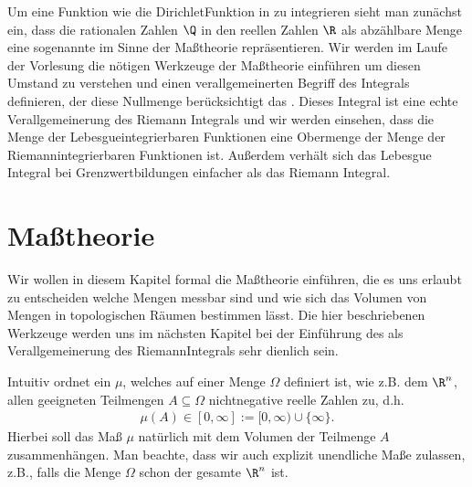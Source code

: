 \documentclass[letterpaper,10pt,english]{jupyterBook}
\begin{document}
\sphinxAtStartPar
Um eine Funktion wie die Dirichlet\sphinxhyphen{}Funktion in {\hyperref[\detokenize{masstheorie/intro_masstheorie:ex:dirichletFunktion}]{}} zu integrieren sieht man zunächst ein, dass die rationalen Zahlen \(\Q\) in den reellen Zahlen \(\R\) als abzählbare Menge eine sogenannte  im Sinne der Maßtheorie repräsentieren.
Wir werden im Laufe der Vorlesung die nötigen Werkzeuge der Maßtheorie einführen um diesen Umstand zu verstehen und einen verallgemeinerten Begriff des Integrals definieren, der diese Nullmenge berücksichtigt \sphinxhyphen{} das .
Dieses Integral ist eine echte Verallgemeinerung des Riemann Integrals und wir werden einsehen, dass die Menge der Lebesgue\sphinxhyphen{}integrierbaren Funktionen eine Obermenge der Menge der Riemann\sphinxhyphen{}integrierbaren Funktionen ist.
Außerdem verhält sich das Lebesgue Integral bei Grenzwertbildungen einfacher als das Riemann Integral.


\section{Maßtheorie}
\label{\detokenize{masstheorie/masstheorie:masztheorie}}\label{\detokenize{masstheorie/masstheorie::doc}}
\sphinxAtStartPar
Wir wollen in diesem Kapitel formal die Maßtheorie einführen, die es uns erlaubt zu entscheiden welche Mengen messbar sind und wie sich das Volumen von Mengen in topologischen Räumen bestimmen lässt.
Die hier beschriebenen Werkzeuge werden uns im nächsten Kapitel bei der Einführung des  als Verallgemeinerung des Riemann\sphinxhyphen{}Integrals sehr dienlich sein.

\sphinxAtStartPar
Intuitiv ordnet ein  \(\mu\), welches auf einer Menge \(\Omega\) definiert ist, wie z.B. dem \(\R^n\), allen geeigneten Teilmengen \(A\subseteq \Omega\) nichtnegative reelle Zahlen zu, d.h.
\begin{equation*}
\begin{split}\mu(A)\in[0,\infty] := [0,\infty)\cup\{\infty\}.\end{split}
\end{equation*}
\sphinxAtStartPar
Hierbei soll das Maß \(\mu\) natürlich mit dem Volumen der Teilmenge \(A\) zusammenhängen.
Man beachte, dass wir auch explizit unendliche Maße zulassen, z.B., falls die Menge \(\Omega\) schon der gesamte \(\R^n\) ist.
\end{document}
